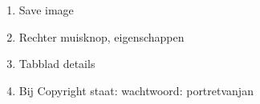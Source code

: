 \begin{enumerate}
  \item Save image
  \item Rechter muisknop, eigenschappen
  \item Tabblad details
  \item Bij Copyright staat: wachtwoord: portretvanjan
\end{enumerate}